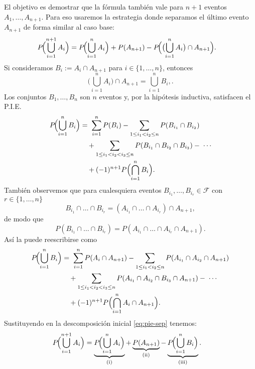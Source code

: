 \documentclass[../Main.tex]{subfiles}
\begin{document}
\begin{demostracion}{}{}
El objetivo es demostrar que la fórmula también vale para \(n+1\) eventos
\(A_1,\dots,A_{n+1}\). Para eso usaremos la estrategia donde separamos el último evento \(A_{n+1}\) de forma similar al caso base:
\begin{equation}
\begin{aligned}
   P\!\Bigl(\bigcup_{i=1}^{n+1}A_i\Bigr)
   &=
   P\!\Bigl(\bigcup_{i=1}^{n}A_i\Bigr)
   +P(A_{n+1})
   -P\!\Bigl(\bigl(\bigcup_{i=1}^{n}A_i\bigr)\cap A_{n+1}\Bigr). 
   \label{eq:pie-sep}
\end{aligned}
\end{equation}
Si consideramos \(B_i := A_i\cap A_{n+1}\) para \(i\in\{1,\dots, n\}\), entonces
\[
  \bigl(\bigcup_{i=1}^{n}A_i\bigr)\cap A_{n+1} = \bigcup_{i=1}^{n}B_i,.
\]
Los conjuntos \(B_1,\dots,B_n\) son \(n\) eventos y, por la hipótesis inductiva, satisfacen el P.I.E. 
\begin{equation}
\begin{aligned}
P\!\Bigl(\bigcup_{i=1}^{n} B_i\Bigr)
  &=\;
    \sum_{i=1}^{n} P(B_i)
    - \sum_{1\le i_1<i_2\le n} P(B_{i_1}\cap B_{i_2}) \\
  &\quad
    + \sum_{1\le i_1<i_2<i_3\le n} P(B_{i_1}\cap B_{i_2}\cap B_{i_3})
    -\; \cdots\\
  &\quad+ (-1)^{n+1} P\Bigl(\bigcap_{i=1}^{n} B_i\Bigr).
\end{aligned}
\label{PIEv2}
\end{equation}
También observemos que para cualesquiera eventos $B_{i_1},\dots,B_{i_r}\in\mathcal F$ con \(r\in\{1,\dots, n\}\)
\[
  B_{i_1}\cap\dots\cap B_{i_r}
  =
  (A_{i_1}\cap\dots\cap A_{i_r})\cap A_{n+1},
\]
de modo que
\[
   P(B_{i_1}\cap\dots\cap B_{i_r})
   =
   P(A_{i_1}\cap\dots\cap A_{i_r}\cap A_{n+1}).
\]
Así la  puede reescribirse como
\begin{equation}
\begin{aligned}
P\!\Bigl(\bigcup_{i=1}^{n} B_i\Bigr)
  &=\;
    \sum_{i=1}^{n} P(A_i\cap A_{n+1})
    - \sum_{1\le i_1<i_2\le n} P(A_{i_1}\cap A_{i_2}\cap A_{n+1}) \\
  &\quad
    + \sum_{1\le i_1<i_2<i_3\le n} P(A_{i_1}\cap A_{i_2}\cap B_{i_3}\cap A_{n+1})
    -\; \cdots\\
  &\quad+ (-1)^{n+1} P\Bigl(\bigcap_{i=1}^{n} A_i\cap A_{n+1}\Bigr).
\end{aligned}
\label{PIEv3}
\end{equation}
 Sustituyendo en la descomposición inicial \ref{eq:pie-sep} tenemos:
\begin{equation}
\begin{aligned}
   P\!\Bigl(\bigcup_{i=1}^{n+1}A_i\Bigr)
   &=
   \underbrace{P\!\Bigl(\bigcup_{i=1}^{n}A_i\Bigr)}_{\text{(i)}}
   +\underbrace{P(A_{n+1})}_{\text{(ii)}}
   -\underbrace{P\!\Bigl(\bigcup_{i=1}^{n}B_i\Bigr)}_{\text{(iii)}}.
\end{aligned}
\label{eq:aux}
\end{equation}


\end{demostracion}
\end{document}
